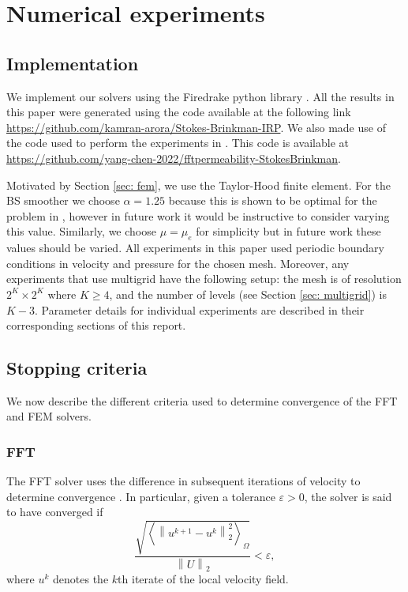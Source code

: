 \documentclass[12pt]{article}
\newcommand\norm[1]{\left\lVert#1\right\rVert}
\newcommand\abrack[1]{\left \langle #1 \right \rangle}
\theoremstyle{theorem}
\begin{document}
\section{Numerical experiments}\label{sec: results}

\subsection{Implementation}\label{sec: implementation}
We implement our solvers using the Firedrake python library \cite{FiredrakeUserManual}. All the results in this paper were generated using the code available at the following link \url{https://github.com/kamran-arora/Stokes-Brinkman-IRP}. We also made use of the code used to perform the experiments in \cite{chen2023}. This code is available at \url{https://github.com/yang-chen-2022/fftpermeability-StokesBrinkman}.

Motivated by Section \ref{sec: fem}, we use the Taylor-Hood finite element. For the BS smoother we choose $\alpha = 1.25$ because this is shown to be optimal for the problem in \cite{larin2008}, however in future work it would be instructive to consider varying this value. Similarly, we choose $\mu = \mu_e$ for simplicity but in future work these values should be varied. All experiments in this paper used periodic boundary conditions in velocity and pressure for the chosen mesh. Moreover, any experiments that use multigrid have the following setup: the mesh is of resolution $2^K \times 2^K$ where $K \geq 4$, and the number of levels (see Section \ref{sec: multigrid}) is $K-3$. Parameter details for individual experiments are described in their corresponding sections of this report.

\subsection{Stopping criteria}\label{sec: stopping}

We now describe the different criteria used to determine convergence of the FFT and FEM solvers.

\subsubsection{FFT}
The FFT solver uses the difference in subsequent iterations of velocity to determine convergence \cite{chen2023}. In particular, given a tolerance $\varepsilon > 0$, the solver is said to have converged if
\begin{equation}
    \frac{\sqrt{\abrack{\norm{u^{k+1}-u^k}_2^2}_\Omega}}{\norm{U}_2} < \varepsilon,
\end{equation}
where $u^k$ denotes the $k$th iterate of the local velocity field.
\end{document}
